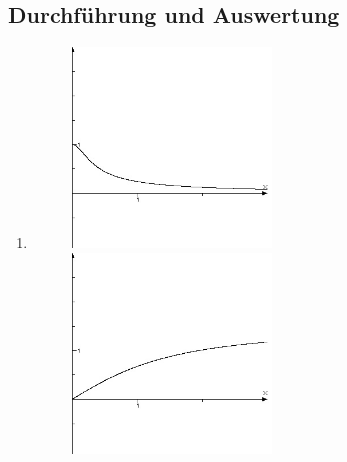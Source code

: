 \documentclass[a4paper,11pt]{scrartcl}
\begin{document}
	\subsection*{Durchführung und Auswertung}
	\begin{enumerate}
		\item \par {\begin{figure}[h]
				\begin{minipage}[t]{0.5\textwidth}
					\includegraphics[width=0.5\textwidth]{amplitude.jpg}
				\end{minipage}
				\begin{minipage}[t]{0.5\textwidth}
					\includegraphics[width=0.5\textwidth]{Phasenlage.jpg}
				\end{minipage}
			\end{figure}}
	\end{enumerate}
	
	
	
\end{document}
